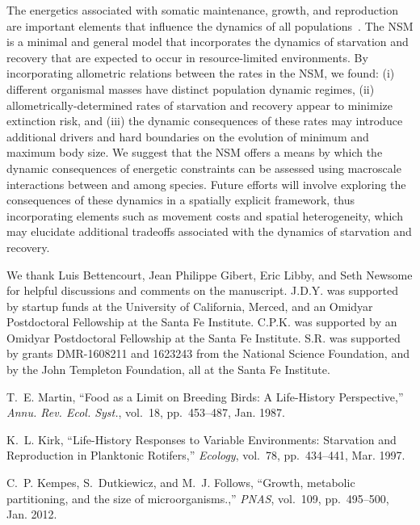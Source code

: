 \documentclass[11pt]{article}
\begin{document}
\begin{multicols}{2}
The energetics associated with somatic maintenance, growth, and reproduction are important elements that influence the dynamics of all populations~\cite{Stearns:1989ip}.  
The NSM is a minimal and general model that incorporates the dynamics of starvation and recovery that are expected to occur in resource-limited environments.  
By incorporating allometric relations between the rates in the NSM, we found: (i) different organismal masses have distinct population dynamic regimes, (ii) allometrically-determined rates of starvation and recovery appear to minimize extinction risk, and (iii) the dynamic consequences of these rates may introduce additional drivers and hard boundaries on the evolution of minimum and maximum body size.  
We suggest that the NSM offers a means by which the dynamic consequences of energetic constraints can be assessed using macroscale interactions between and among species.  
Future efforts will involve exploring the consequences of these dynamics in a spatially explicit framework, thus incorporating elements such as movement costs and spatial heterogeneity, which may elucidate additional tradeoffs associated with the dynamics of starvation and recovery.

\vspace{2mm}

{\small
  We thank Luis Bettencourt, Jean Philippe Gibert, Eric Libby, and Seth Newsome for helpful
  discussions and comments on the manuscript.  J.D.Y. was supported by
  startup funds at the University of California, Merced, and an Omidyar
  Postdoctoral Fellowship at the Santa Fe Institute.  C.P.K. was supported by
  an Omidyar Postdoctoral Fellowship at the Santa Fe Institute.  S.R. was
  supported by grants DMR-1608211 and 1623243 from the National Science
  Foundation, and by the John Templeton Foundation, all at the Santa Fe
  Institute.
}


%
\small{
\begin{thebibliography}{10}

T.~E. Martin, ``{Food as a Limit on Breeding Birds: A Life-History
  Perspective},'' {\em Annu. Rev. Ecol. Syst.}, vol.~18, pp.~453--487, Jan.
  1987.

K.~L. Kirk, ``{Life-History Responses to Variable Environments: Starvation and
  Reproduction in Planktonic Rotifers},'' {\em Ecology}, vol.~78, pp.~434--441,
  Mar. 1997.

C.~P. Kempes, S.~Dutkiewicz, and M.~J. Follows, ``{Growth, metabolic
  partitioning, and the size of microorganisms.},'' {\em PNAS}, vol.~109,
  pp.~495--500, Jan. 2012.


\end{thebibliography}}
\end{multicols}
\end{document}
